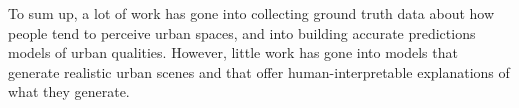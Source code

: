 To sum up, a lot of work has gone into collecting ground truth data about how people tend to perceive urban spaces, and into building accurate predictions models of urban qualities. However,  little work has gone into models that generate realistic urban scenes and that offer human-interpretable explanations of what they generate. 


